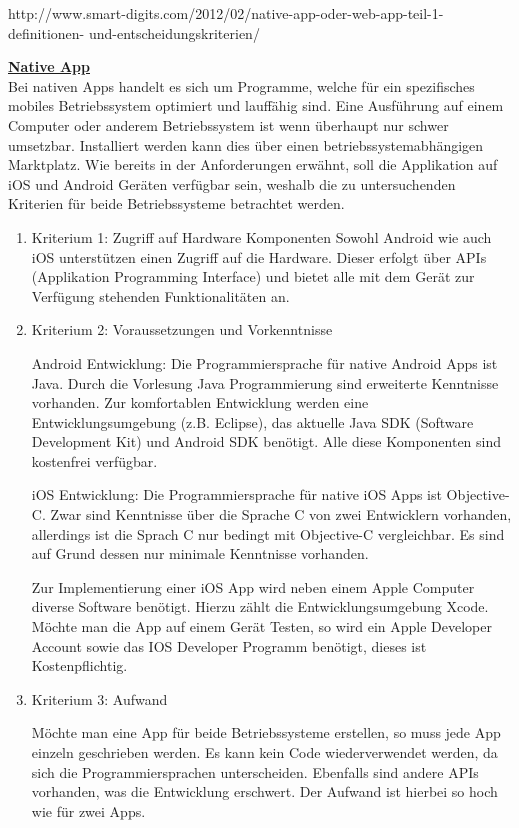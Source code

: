 http://www.smart-digits.com/2012/02/native-app-oder-web-app-teil-1-definitionen-
und-entscheidungskriterien/



\textbf{\underline{Native App}}\\
Bei nativen Apps handelt es sich um Programme, welche für ein spezifisches mobiles 
Betriebssystem optimiert und lauffähig sind. Eine Ausführung auf einem Computer oder anderem 
Betriebssystem ist wenn überhaupt nur schwer umsetzbar.
Installiert werden kann dies über einen betriebssystemabhängigen Marktplatz. Wie 
bereits in der Anforderungen erwähnt, soll die Applikation auf iOS und Android 
Geräten verfügbar sein, weshalb die zu untersuchenden Kriterien für beide 
Betriebssysteme betrachtet werden.

\begin{enumerate}
\item Kriterium 1: Zugriff auf Hardware Komponenten
Sowohl Android wie auch iOS unterstützen einen Zugriff auf die Hardware. 
Dieser erfolgt über APIs (Applikation Programming Interface) und bietet alle mit 
dem Gerät zur Verfügung stehenden Funktionalitäten an.

\item Kriterium 2: Voraussetzungen und Vorkenntnisse

Android Entwicklung:
Die Programmiersprache für native Android Apps ist Java. Durch die Vorlesung Java 
Programmierung sind erweiterte Kenntnisse vorhanden. Zur komfortablen Entwicklung 
werden eine Entwicklungsumgebung (z.B. Eclipse), das aktuelle Java SDK (Software 
Development Kit) und Android SDK benötigt. Alle diese Komponenten sind kostenfrei 
verfügbar.

iOS Entwicklung:
Die Programmiersprache für native iOS Apps ist Objective-C. Zwar sind Kenntnisse 
über die Sprache C von zwei Entwicklern vorhanden, allerdings ist die Sprach C nur 
bedingt mit Objective-C vergleichbar. Es sind auf Grund dessen nur minimale 
Kenntnisse vorhanden.

Zur Implementierung einer iOS App wird neben einem Apple Computer diverse Software 
benötigt. Hierzu zählt die Entwicklungsumgebung Xcode. Möchte man die App auf einem 
Gerät Testen, so wird ein Apple Developer Account sowie das IOS Developer Programm benötigt, 
dieses ist Kostenpflichtig.



\item Kriterium 3: Aufwand

Möchte man eine App für beide Betriebssysteme erstellen, so muss jede App einzeln 
geschrieben werden. Es kann kein Code wiederverwendet werden, da sich die 
Programmiersprachen unterscheiden. Ebenfalls sind andere APIs vorhanden, was die 
Entwicklung erschwert. Der Aufwand ist hierbei so hoch wie für zwei Apps. 
\end{enumerate}

